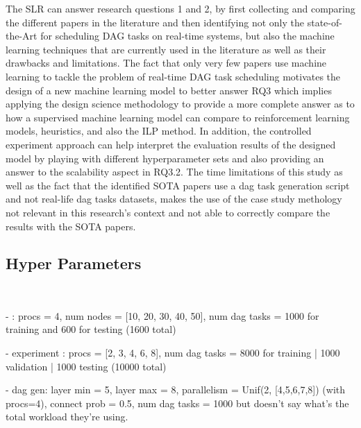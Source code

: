 The SLR can answer research questions 1 and 2,
by first collecting and comparing the different papers in the literature
and then identifying not only the state-of-the-Art for scheduling DAG tasks on real-time systems,
but also the machine learning techniques that are currently used in the literature as well as their drawbacks and limitations.
The fact that only very few papers use machine learning to tackle the problem of real-time DAG task scheduling
motivates the design of a new machine learning model to better answer RQ3 which implies 
applying the design science methodology to provide a more complete answer as to how a supervised machine learning model 
can compare to reinforcement learning models, heuristics, and also the ILP method.
In addition, the controlled experiment approach can help interpret the evaluation results of the designed model by 
playing with different hyperparameter sets and also  
 providing an answer to the scalability aspect in RQ3.2.
The time limitations of this study as well as the fact that the identified SOTA papers
use a dag task generation script and not real-life dag tasks datasets, makes
the use of the case study methology not relevant in this research's context and not able to correctly compare the results with 
the SOTA papers. 


\subsection{Hyper Parameters}
~

\begin{list}{}{}
    \item - \citet{Zhao2024GATDRLmodel} : procs = 4, num nodes = [10, 20, 30, 40, 50], num dag tasks = 1000 for training and 600 for testing (1600 total)
    \item - \citet{Lee2021GlobalDagSchedDRL} experiment : procs = [2, 3, 4, 6, 8], num dag tasks = 8000 for training | 1000 validation | 1000 testing (10000 total)
    \item -  \citet{zhao2020DAGsched} dag gen: layer min = 5, layer max = 8, parallelism = Unif(2, [4,5,6,7,8]) (with procs=4), connect prob = 0.5,
                num dag tasks = 1000  but doesn't say what's the total workload they're using. 
\end{list}